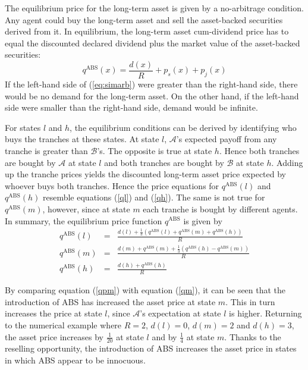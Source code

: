 \documentclass[11pt]{article}
\theoremstyle{plain}
\begin{document}
The equilibrium price for the long-term asset is given by a no-arbitrage condition. Any agent could buy the long-term asset and sell the asset-backed securities derived from it. In equilibrium, the long-term asset cum-dividend price has to equal the discounted declared dividend plus the market value of the asset-backed securities:
\begin{equation} \label{eq:simarb}
q^{\mathrm{ABS}}(x) = \frac{d(x)}{R} + p_s(x) + p_j(x)
\end{equation}
If the left-hand side of (\ref{eq:simarb}) were greater than the right-hand side, there would be no demand for the long-term asset. On the other hand, if the left-hand side were smaller than the right-hand side, demand would be infinite.

For states $l$ and $h$, the equilibrium conditions can be derived by identifying who buys the tranches at these states. At state $l$, $\mathcal{A}$'s expected payoff from any tranche is greater than $\mathcal{B}$'s. The opposite is true at state $h$. Hence both tranches are bought by $\mathcal{A}$ at state $l$ and both tranches are bought by $\mathcal{B}$ at state $h$. Adding up the tranche prices yields the discounted long-term asset price expected by whoever buys both tranches. Hence the price equations for $q^{\mathrm{ABS}}(l)$ and $q^{\mathrm{ABS}}(h)$ resemble equations (\ref{ql}) and (\ref{qh}). The same is not true for $q^{\mathrm{ABS}}(m)$, however, since at state $m$ each tranche is bought by different agents. In summary, the equilibrium price function $q^{\mathrm{ABS}}$ is given by
\begin{eqnarray}
q^{\mathrm{ABS}}(l) & = & \frac{d(l)+\frac{1}{3}\left(q^{\mathrm{ABS}}(l)+q^{\mathrm{ABS}}(m)+q^{\mathrm{ABS}}(h)\right)}{R} \label{qpl}\\
q^{\mathrm{ABS}}(m) & = & \frac{ d(m) +  q^{\mathrm{ABS}}(m) + \frac{1}{3}(q^{\mathrm{ABS}}(h)-q^{\mathrm{ABS}}(m))} {R} \label{qpm} \\
q^{\mathrm{ABS}}(h) & = & \frac{d(h)+q^{\mathrm{ABS}}(h)}{R} \label{qph}
\end{eqnarray}

By comparing equation (\ref{qpm}) with equation (\ref{qm}), it can be seen that the introduction of ABS has increased the asset price at state $m$. This in turn increases the price at state $l$, since $\mathcal{A}$'s expectation at state $l$ is higher. Returning to the numerical example where $R=2$, $d(l)=0$, $d(m)=2$ and $d(h)=3$, the asset price increases by $\frac{1}{20}$ at state $l$ and by $\frac{1}{4}$ at state $m$. Thanks to the reselling opportunity, the introduction of ABS increases the asset price in states in which ABS appear to be innocuous.
\end{document}
